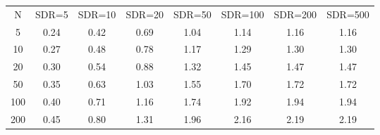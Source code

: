 \begin{table}
\begin{tabular}{cccccccc}
N & SDR=5 & SDR=10 & SDR=20 & SDR=50 & SDR=100 & SDR=200 & SDR=500 \\
5 & 0.24 & 0.42 & 0.69 & 1.04 & 1.14 & 1.16 & 1.16 \\
10 & 0.27 & 0.48 & 0.78 & 1.17 & 1.29 & 1.30 & 1.30 \\
20 & 0.30 & 0.54 & 0.88 & 1.32 & 1.45 & 1.47 & 1.47 \\
50 & 0.35 & 0.63 & 1.03 & 1.55 & 1.70 & 1.72 & 1.72 \\
100 & 0.40 & 0.71 & 1.16 & 1.74 & 1.92 & 1.94 & 1.94 \\
200 & 0.45 & 0.80 & 1.31 & 1.96 & 2.16 & 2.19 & 2.19 \\
\end{tabular}
\end{table}
